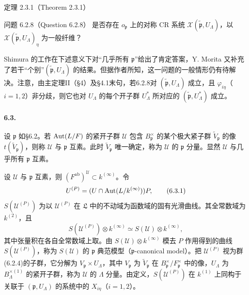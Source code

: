 \begin{originaltheorem}{定理 2.3.1（Theorem 2.3.1）}
\begin{originaltheorem}{问题 6.2.8（Question 6.2.8）}
是否存在 $o_{\mathfrak p}$ 上的对称 CR 系统 $\mathcal X(\widetilde{\mathfrak p},U_\Lambda)$，以 $\mathcal X(\widetilde{\mathfrak p},U_\Lambda)_\eta$ 为一般纤维？
\end{originaltheorem}
Shimura 的工作在下述意义下对“几乎所有 $\mathfrak p$”给出了肯定答案，Y. Morita 又补充了若干“个别”$(\widetilde{\mathfrak p},U_\Lambda)$ 的结果。但据作者所知，这一问题的一般情形仍有待解决。注意，由主定理II（§4）及§4.1末句，若6.2.8对 $(\widetilde{\mathfrak p},U_\Lambda)$ 成立，且 $\varphi_{i\eta}$（$i=1,2$）非分歧，则它也对 $U_\Lambda$ 的每个开子群 $U_\Lambda^*$ 所对应的 $(\widetilde{\mathfrak p},U_\Lambda^*)$ 成立。

\paragraph*{6.3.}
设 $\mathfrak p$ 如§6.2。若 $\operatorname{Aut}(L/F)$ 的紧开子群 $\mathcal U$ 包含 $B_{\mathfrak p}^\times$ 的某个极大紧子群 $\widetilde V_{\mathfrak p}$ 的像 $t(\widetilde V_{\mathfrak p})$，则称 $\mathcal U$ 与 $\mathfrak p$ 互素。此时 $\widetilde V_{\mathfrak p}$ 唯一确定，称为 $\mathcal U$ 的 $\mathfrak p$ 分量。显然 $\mathcal U$ 与几乎所有 $\mathfrak p$ 互素。

设 $\mathcal U$ 与 $\mathfrak p$ 互素，则 $(F^{\mathrm{ab}})^{\mathcal U}\subset k^{(\infty)}$。令
\[
 U^{(P)}=(U\cap\operatorname{Aut}(L/k^{(\infty)}))P,\tag{6.3.1}
\]
$S(\mathcal U^{(P)})$ 为以 $\mathcal U^{(P)}$ 在 $\mathfrak L$ 中的不动域为函数域的固有光滑曲线。其全常数域为 $k^{(2)}$，且
\[
 S(\mathcal U^{(P)})\otimes k^{(\infty)}
 \simeq S(\mathcal U)\otimes k^{(\infty)},\tag{6.3.2}
\]
其中张量积在各自全常数域上取。由 $S(\mathcal U)\otimes k^{(\infty)}$ 模去 $P$ 作用得到的曲线 $S(\mathcal U^{(P)})$，称为 $S(\mathcal U)$ 的 $\mathfrak p$ 典范模型（$\mathfrak p$-canonical model）。把 $\mathcal U^{(P)}$ 视为群(6.2.4)的子群，它分解为 $V_{\mathfrak p}\times U_\Lambda$，其中 $V_{\mathfrak p}$ 为 $\widetilde V_{\mathfrak p}$ 在 $B_{\mathfrak p}^\times/F_{\mathfrak p}^\times$ 中的像，$U_\Lambda$ 为 $B_\Lambda^{\times(1)}$ 的紧开子群，称为 $\mathcal U$ 的 $\Lambda$ 分量。由定义，$S(\mathcal U^{(P)})$ 在 $k^{(1)}$ 上同构于关联于 $(\mathfrak p,U_\Lambda)$ 的系统中的 $X_{i\eta}$（$i=1,2$）。


\end{originaltheorem}
